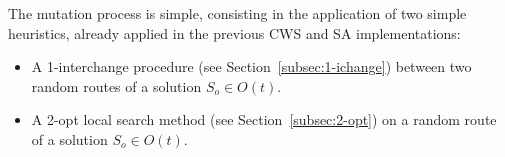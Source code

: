 The mutation process is 
simple, consisting in the application of two simple heuristics, already 
applied in the previous CWS and SA implementations: 

\begin{itemize}
    \item A 1-interchange procedure (see Section~\ref{subsec:1-ichange}) between two random routes of a solution 
        $S_o \in O(t)$.
    \item A 2-opt local search method (see Section~\ref{subsec:2-opt}) on a random route 
        of a solution $S_o \in O(t)$.
\end{itemize}



